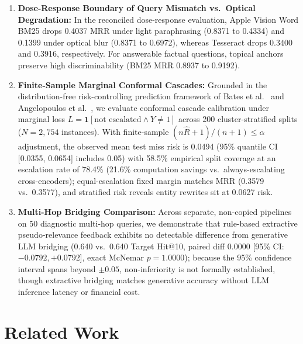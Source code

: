\documentclass[conference]{IEEEtran}
\begin{document}
\begin{enumerate}
    \item \textbf{Dose-Response Boundary of Query Mismatch vs.\ Optical Degradation:} In the reconciled dose-response evaluation, Apple Vision Word BM25 drops 0.4037 MRR under light paraphrasing (0.8371 to 0.4334) and 0.1399 under optical blur (0.8371 to 0.6972), whereas Tesseract drops 0.3400 and 0.3916, respectively. For answerable factual questions, topical anchors preserve high discriminability (BM25 MRR 0.8937 to 0.9192).
    \item \textbf{Finite-Sample Marginal Conformal Cascades:} Grounded in the distribution-free risk-controlling prediction framework of Bates et al.~\cite{bates2021conformal} and Angelopoulos et al.~\cite{angelopoulos2021gentle}, we evaluate conformal cascade calibration under marginal loss $L = \mathbf{1}[\text{not escalated} \land Y \ne 1]$ across 200 cluster-stratified splits ($N=2{,}754$ instances). With finite-sample $(n\hat{R}+1)/(n+1) \le \alpha$ adjustment, the observed mean test miss risk is 0.0494 (95\% quantile CI [0.0355, 0.0654] includes 0.05) with 58.5\% empirical split coverage at an escalation rate of 78.4\% (21.6\% computation savings vs.\ always-escalating cross-encoders); equal-escalation fixed margin matches MRR (0.3579 vs.\ 0.3577), and stratified risk reveals entity rewrites sit at 0.0627 risk.
    \item \textbf{Multi-Hop Bridging Comparison:} Across separate, non-copied pipelines on 50 diagnostic multi-hop queries, we demonstrate that rule-based extractive pseudo-relevance feedback exhibits no detectable difference from generative LLM bridging (0.640 vs.\ 0.640 Target Hit@10, paired diff $0.0000$ [95\% CI: $-0.0792, +0.0792$], exact McNemar $p = 1.0000$); because the 95\% confidence interval spans beyond $\pm 0.05$, non-inferiority is not formally established, though extractive bridging matches generative accuracy without LLM inference latency or financial cost.
\end{enumerate}

\section{Related Work}
\end{document}
